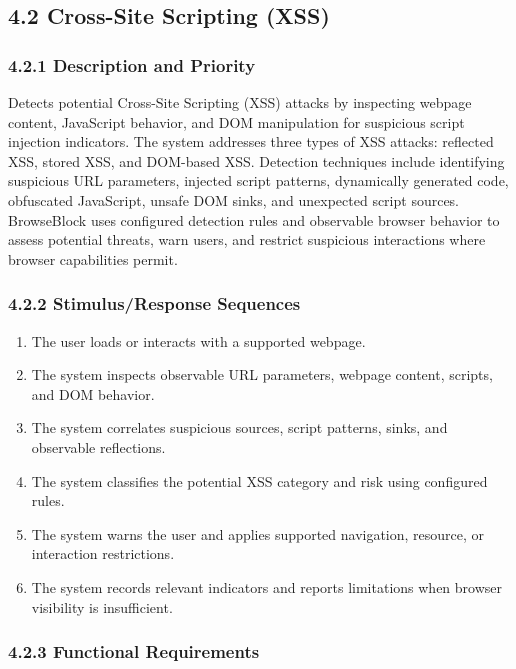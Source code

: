 \documentclass[12pt,a4paper]{report}
\let\originaladdcontentsline\addcontentsline
\renewcommand{\addcontentsline}[3]{\phantomsection\originaladdcontentsline{#1}{#2}{#3}}
\begin{document}
\subsection*{4.2 Cross-Site Scripting (XSS)}

\subsubsection*{4.2.1 Description and Priority}

Detects potential Cross-Site Scripting (XSS) attacks by inspecting webpage content, JavaScript behavior, and DOM manipulation for suspicious script injection indicators. The system addresses three types of XSS attacks: reflected XSS, stored XSS, and DOM-based XSS. Detection techniques include identifying suspicious URL parameters, injected script patterns, dynamically generated code, obfuscated JavaScript, unsafe DOM sinks, and unexpected script sources. BrowseBlock uses configured detection rules and observable browser behavior to assess potential threats, warn users, and restrict suspicious interactions where browser capabilities permit.\par

\subsubsection*{4.2.2 Stimulus/Response Sequences}

\begin{enumerate}
\item The user loads or interacts with a supported webpage.
\item The system inspects observable URL parameters, webpage content, scripts, and DOM behavior.
\item The system correlates suspicious sources, script patterns, sinks, and observable reflections.
\item The system classifies the potential XSS category and risk using configured rules.
\item The system warns the user and applies supported navigation, resource, or interaction restrictions.
\item The system records relevant indicators and reports limitations when browser visibility is insufficient.
\end{enumerate}

\subsubsection*{4.2.3 Functional Requirements}
\end{document}
